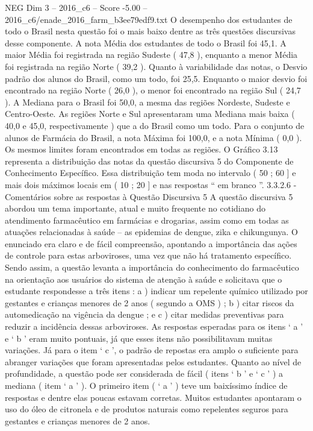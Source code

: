 \begin{textsample}{NEG Dim 3 – 2016\_c6 – Score -5.00 – 2016\_c6/enade\_2016\_farm\_b3ee79edf9.txt}
O desempenho dos estudantes de todo o Brasil nesta questão foi o mais baixo dentre as três questões discursivas desse componente.
A nota Média dos estudantes de todo o Brasil foi 45,1.
A maior Média foi registrada na região Sudeste ( 47,8 ), enquanto a menor Média foi registrada na região Norte ( 39,2 ).
Quanto à variabilidade das notas, o Desvio padrão dos alunos do Brasil, como um todo, foi 25,5.
Enquanto o maior desvio foi encontrado na região Norte ( 26,0 ), o menor foi encontrado na região Sul ( 24,7 ).
A Mediana para o Brasil foi 50,0, a mesma das regiões Nordeste, Sudeste e Centro-Oeste.
As regiões Norte e Sul apresentaram uma Mediana mais baixa ( 40,0 e 45,0, respectivamente ) que a do Brasil como um todo.
Para o conjunto de alunos de Farmácia do Brasil, a nota Máxima foi 100,0, e a nota Mínima ( 0,0 ).
Os mesmos limites foram encontrados em todas as regiões.
O Gráfico 3.13 representa a distribuição das notas da questão discursiva 5 do Componente de Conhecimento Específico.
Essa distribuição tem moda no intervalo ( 50 ; 60 ] e mais dois máximos locais em ( 10 ; 20 ] e nas respostas “ em branco ”. 3.3.2.6 - Comentários sobre as respostas à Questão Discursiva 5 A questão discursiva 5 abordou um tema importante, atual e muito frequente no cotidiano do atendimento farmacêutico em farmácias e drogarias, assim como em todas as atuações relacionadas à saúde – as epidemias de dengue, zika e chikungunya.
O enunciado era claro e de fácil compreensão, apontando a importância das ações de controle para estas arboviroses, uma vez que não há tratamento específico.
Sendo assim, a questão levanta a importância do conhecimento do farmacêutico na orientação aos usuários do sistema de atenção à saúde e solicitava que o estudante respondesse a três itens : a ) indicar um repelente químico utilizado por gestantes e crianças menores de 2 anos ( segundo a OMS ) ; b ) citar riscos da automedicação na vigência da dengue ; e c ) citar medidas preventivas para reduzir a incidência dessas arboviroses.
As respostas esperadas para os itens ‘ a ’ e ‘ b ’ eram muito pontuais, já que esses itens não possibilitavam muitas variações.
Já para o item ‘ c ’, o padrão de repostas era amplo o suficiente para abranger variações que foram apresentadas pelos estudantes.
Quanto ao nível de profundidade, a questão pode ser considerada de fácil ( itens ‘ b ’ e ‘ c ’ ) a mediana ( item ‘ a ’ ).
O primeiro item ( ‘ a ’ ) teve um baixíssimo índice de respostas e dentre elas poucas estavam corretas.
Muitos estudantes apontaram o uso do óleo de citronela e de produtos naturais como repelentes seguros para gestantes e crianças menores de 2 anos.

\end{textsample}
